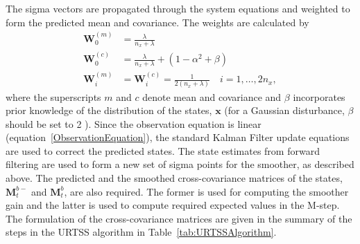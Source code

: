 \documentclass[]{article}
\begin{document}
The sigma vectors are propagated through the system equations and weighted to form the predicted mean and covariance. The weights are calculated by 
\begin{align}
	\mathbf W_0^{(m)}&=\frac{\lambda}{ n_x+\lambda} \\
	\mathbf W_0^{(c)}&=\frac{\lambda}{ n_x+\lambda}+(1-\alpha^2+\beta) \\
	\mathbf W_i^{(m)}&=\mathbf W_i^{(c)}=\frac{1}{2( n_x+\lambda)} \quad i=1, \dots, 2n_x, 
\end{align}
where the superscripts $m$ and $c$ denote mean and covariance and $\beta$ incorporates prior knowledge of the distribution of the states, $\mathbf{x}$ (for a Gaussian disturbance, $\beta$ should be set to 2 \cite{Haykin2001}). Since the observation equation is linear (equation~\ref{ObservationEquation}), the standard Kalman Filter update equations are used to correct the predicted states. The state estimates from forward filtering are used to form a new set of sigma points for the smoother, as described above. The predicted and the smoothed cross-covariance matrices of the states, $\mathbf M_{t}^{b-}$ and  $\mathbf M_{t}^{b}$, are also required. The former is used  for computing the smoother gain and the latter is used to compute required expected values in the M-step. The formulation of the cross-covariance matrices are given in the summary of the steps in the URTSS algorithm in Table~\ref{tab:URTSSAlgorithm}.  
\end{document}
